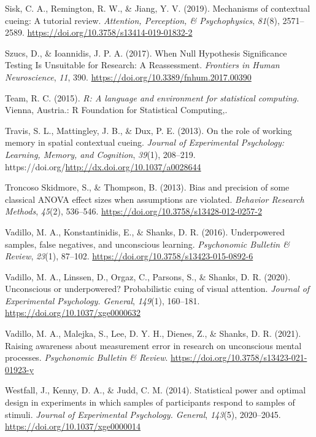 \documentclass[
  man]{apa6}
\newlength{\cslhangindent}
\newlength{\cslentryspacingunit} %
\newenvironment{CSLReferences}[2] %
 {%
  \setlength{\parindent}{0pt}
  \ifodd #1
  \let\oldpar\par
  \def\par{\hangindent=\cslhangindent\oldpar}
  \fi
  \setlength{\parskip}{#2\cslentryspacingunit}
 }%
 {}
\begin{document}
\begin{CSLReferences}{1}{0}
\leavevmode{}%
Sisk, C. A., Remington, R. W., \& Jiang, Y. V. (2019). Mechanisms of contextual cueing: {A} tutorial review. \emph{Attention, Perception, \& Psychophysics}, \emph{81}(8), 2571--2589. \url{https://doi.org/10.3758/s13414-019-01832-2}

\leavevmode{}%
Szucs, D., \& Ioannidis, J. P. A. (2017). When {Null Hypothesis Significance Testing Is Unsuitable} for {Research}: {A Reassessment}. \emph{Frontiers in Human Neuroscience}, \emph{11}, 390. \url{https://doi.org/10.3389/fnhum.2017.00390}

\leavevmode{}%
Team, R. C. (2015). \emph{R: {A} language and environment for statistical computing.} {Vienna, Austria.}: R Foundation for Statistical Computing,.

\leavevmode{}%
Travis, S. L., Mattingley, J. B., \& Dux, P. E. (2013). On the role of working memory in spatial contextual cueing. \emph{Journal of Experimental Psychology: Learning, Memory, and Cognition}, \emph{39}(1), 208--219. https://doi.org/\url{http://dx.doi.org/10.1037/a0028644}

\leavevmode{}%
Troncoso Skidmore, S., \& Thompson, B. (2013). Bias and precision of some classical {ANOVA} effect sizes when assumptions are violated. \emph{Behavior Research Methods}, \emph{45}(2), 536--546. \url{https://doi.org/10.3758/s13428-012-0257-2}

\leavevmode{}%
Vadillo, M. A., Konstantinidis, E., \& Shanks, D. R. (2016). Underpowered samples, false negatives, and unconscious learning. \emph{Psychonomic Bulletin \& Review}, \emph{23}(1), 87--102. \url{https://doi.org/10.3758/s13423-015-0892-6}

\leavevmode{}%
Vadillo, M. A., Linssen, D., Orgaz, C., Parsons, S., \& Shanks, D. R. (2020). Unconscious or underpowered? {Probabilistic} cuing of visual attention. \emph{Journal of Experimental Psychology. General}, \emph{149}(1), 160--181. \url{https://doi.org/10.1037/xge0000632}

\leavevmode{}%
Vadillo, M. A., Malejka, S., Lee, D. Y. H., Dienes, Z., \& Shanks, D. R. (2021). Raising awareness about measurement error in research on unconscious mental processes. \emph{Psychonomic Bulletin \& Review}. \url{https://doi.org/10.3758/s13423-021-01923-y}

\leavevmode{}%
Westfall, J., Kenny, D. A., \& Judd, C. M. (2014). Statistical power and optimal design in experiments in which samples of participants respond to samples of stimuli. \emph{Journal of Experimental Psychology. General}, \emph{143}(5), 2020--2045. \url{https://doi.org/10.1037/xge0000014}

\end{CSLReferences}
\end{document}

